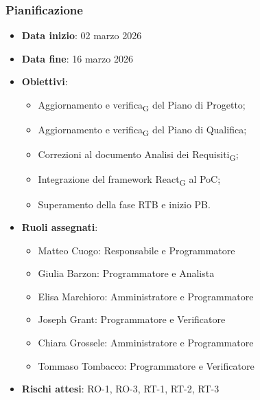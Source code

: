 \documentclass[11pt,a4paper]{article}
\newcommand{\gls}[1]{#1\textsubscript{G}}
\begin{document}
\subsubsection{Pianificazione}
\begin{itemize}
    \item \textbf{Data inizio}: 02 marzo 2026
    \item \textbf{Data fine}: 16 marzo 2026
    \item \textbf{Obiettivi}:
    \begin{itemize}
        \item Aggiornamento e \gls{verifica} del Piano di Progetto;
        \item Aggiornamento e \gls{verifica} del Piano di Qualifica;
        \item Correzioni al documento \gls{Analisi dei Requisiti};
        \item Integrazione del framework \gls{React} al PoC;
        \item Superamento della fase RTB e inizio PB.
        
    \end{itemize}
    \item \textbf{Ruoli assegnati}:
    \begin{itemize}
        \item Matteo Cuogo: Responsabile e Programmatore
        \item Giulia Barzon: Programmatore e Analista
        \item Elisa Marchioro: Amministratore e Programmatore
        \item Joseph Grant: Programmatore e Verificatore
        \item Chiara Grossele: Amministratore e Programmatore
        \item Tommaso Tombacco: Programmatore e Verificatore
    \end{itemize}
    \item \textbf{Rischi attesi}: RO-1, RO-3, RT-1, RT-2, RT-3
\end{itemize}
\end{document}
